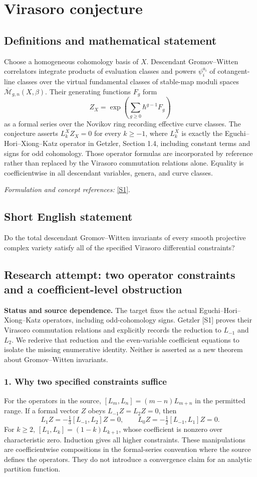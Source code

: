 \documentclass[11pt]{article}
\begin{document}
\section*{\texorpdfstring{Virasoro conjecture}{Virasoro conjecture}}\label{statement}
\subsection{Definitions and mathematical statement}
Choose a homogeneous cohomology basis of $X$. Descendant Gromov--Witten correlators integrate products of evaluation classes and powers $\psi_i^{a_i}$ of cotangent-line classes over the virtual fundamental classes of stable-map moduli spaces $\overline{\mathcal M}_{g,n}(X,\beta)$. Their generating functions $F_g$ form
\[
 Z_X=\exp\left(\sum_{g\ge0}\hbar^{g-1}F_g\right)
\]
as a formal series over the Novikov ring recording effective curve classes. The conjecture asserts $L_k^XZ_X=0$ for every $k\ge-1$, where $L_k^X$ is exactly the Eguchi--Hori--Xiong--Katz operator in Getzler, Section 1.4, including constant terms and signs for odd cohomology. Those operator formulas are incorporated by reference rather than replaced by the Virasoro commutation relations alone. Equality is coefficientwise in all descendant variables, genera, and curve classes.
\par\smallskip\textit{Formulation and concept references:} \href{https://arxiv.org/pdf/math/9812026}{[S1]}.

\subsection{Short English statement}
Do the total descendant Gromov–Witten invariants of every smooth projective complex variety satisfy all of the specified Virasoro differential constraints?
\subsection{Research attempt: two operator constraints and a coefficient-level obstruction}
\textbf{Status and source dependence.} The target fixes the actual Eguchi--Hori--Xiong--Katz operators, including odd-cohomology signs. Getzler [S1] proves their Virasoro commutation relations and explicitly records the reduction to $L_{-1}$ and $L_2$. We rederive that reduction and the even-variable coefficient equations to isolate the missing enumerative identity. Neither is asserted as a new theorem about Gromov--Witten invariants.

\subsubsection{1. Why two specified constraints suffice}
For the operators in the source, $[L_m,L_n]=(m-n)L_{m+n}$ in the permitted range. If a formal vector $Z$ obeys $L_{-1}Z=L_2Z=0$, then
\[L_1Z=-\tfrac13[L_{-1},L_2]Z=0,\qquad L_0Z=-\tfrac12[L_{-1},L_1]Z=0.\]
For $k\ge2$, $[L_1,L_k]=(1-k)L_{k+1}$, whose coefficient is nonzero over characteristic zero. Induction gives all higher constraints. These manipulations are coefficientwise compositions in the formal-series convention where the source defines the operators. They do not introduce a convergence claim for an analytic partition function.
\end{document}
